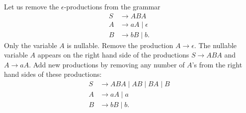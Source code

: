 

\setcounter{section}{5}
\setcounter{subsection}{2}
\setcounter{dfn}{8}

\begin{exl}
Let us remove the $\epsilon$-productions from the grammar
\begin{align*}
S &\to ABA\\
A &\to aA \mid \epsilon\\
B &\to bB \mid b.
\end{align*}
Only the variable $A$ is nullable.
Remove the production $A \to \epsilon$.
The nullable variable $A$ appears on the right hand side of the productions $S \to ABA$ and $A \to aA$.
Add new productions by removing any number of $A$'s from the right hand sides of these productions:
\begin{align*}
S &\to ABA \mid AB \mid BA \mid B\\
A &\to aA \mid a\\
B &\to bB \mid b.
\end{align*}
\end{exl}


